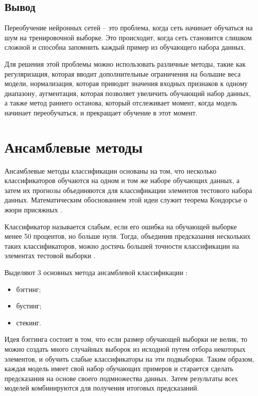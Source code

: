 \subsection{Вывод}
Переобучение нейронных сетей -- это проблема, когда сеть начинает обучаться на шум на тренировочной выборке. Это происходит, когда сеть становится слишком сложной и способна запомнить каждый пример из обучающего набора данных. 

Для решения этой проблемы можно использовать различные методы, такие как регуляризация, которая вводит дополнительные ограничения на большие веса модели, нормализация, которая приводит значения входных признаков к одному диапазону, аугментация, которая позволяет увеличить обучающий набор данных, а также метод раннего останова, который отслеживает момент, когда модель начинает переобучаться, и прекращает обучение в этот момент.


\section{Ансамблевые методы}
Ансамблевые методы классификации основаны на том, что несколько классификаторов обучаются на одном и том же наборе обучающих данных, а затем их прогнозы объединяются для классификации элементов тестового набора данных. Математическим обоснованием этой идеи служит теорема Кондорсье о жюри присяжных \cite{ansambles}.

Классификатор называется слабым, если его ошибка на обучающей выборке менее 50 процентов, но больше нуля. Тогда, объединив предсказания нескольких таких классификаторов, можно достичь большей точности классификации на элементах тестовой выборки \cite{ansambles}.

Выделяют 3 основных метода ансамблевой классификации \cite{ansambles}:
\begin{itemize}
	\item бэггинг;
	\item бустинг;
	\item стекинг.
\end{itemize}

Идея бэггинга состоит в том, что если размер обучающей выборки не велик, то можно создать много случайных выборок из исходной путем отбора некоторых элементов, и обучить слабые классификаторы на эти подвыборки. Таким образом, каждая модель имеет свой набор обучающих примеров и старается сделать предсказания на основе своего подмножества данных. Затем результаты всех моделей комбинируются для получения итоговых предсказаний.


